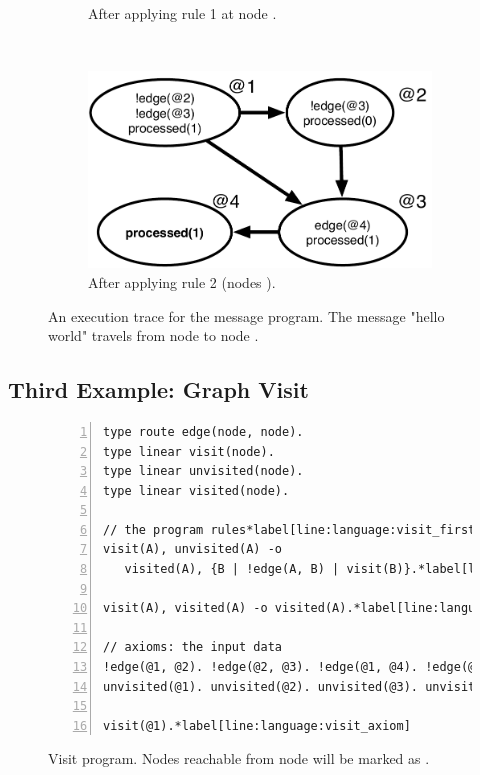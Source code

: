 \begin{figure}[h]
\begin{subfigure}[b]{0.5\textwidth}
                \caption{After applying rule 1 at node .}
                \label{fig:message_trace3}
        \end{subfigure}%
        ~
        \begin{subfigure}[b]{0.5\textwidth}
                  \includegraphics[width=\textwidth]{figures/message/message_trace4}
                  \caption{After applying rule 2 (nodes ).}
                  \label{fig:message_trace4}
          \end{subfigure}
        \caption{An execution trace for the message program. The message "hello
        world" travels from node  to node .}\label{fig:message_trace}
\end{figure}

\subsection{Third Example: Graph Visit}

\begin{figure}[h!]
\begin{Verbatim}[numbers=left,fontsize=\codesize,commandchars=\*\[\]]
type route edge(node, node).
type linear visit(node).
type linear unvisited(node).
type linear visited(node).

// the program rules*label[line:language:visit_first1]
visit(A), unvisited(A) -o
   visited(A), {B | !edge(A, B) | visit(B)}.*label[line:language:visit_first2]*label[line:language:visit_comprehension]

visit(A), visited(A) -o visited(A).*label[line:language:visit_second]

// axioms: the input data
!edge(@1, @2). !edge(@2, @3). !edge(@1, @4). !edge(@2, @4).
unvisited(@1). unvisited(@2). unvisited(@3). unvisited(@4).

visit(@1).*label[line:language:visit_axiom]
\end{Verbatim}
  \caption{Visit program. Nodes reachable from node  will be marked
     as .}
  \label{code:visit}
\end{figure}
\normalsize

